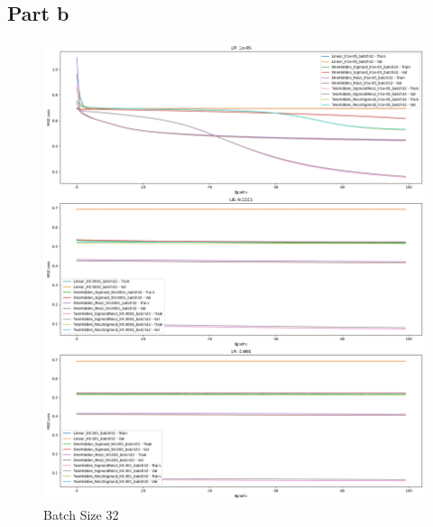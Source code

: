 \subsection*{Part b}
\begin{figure}[!h]
    \centering
    \begin{minipage}{0.32\linewidth}
        \includegraphics[width=\linewidth]{crossentropy_batch32.png}
        \caption{Batch Size 32}
    \end{minipage}
    \hfill
    \begin{minipage}{0.32\linewidth}

\end{minipage}
\end{figure}
